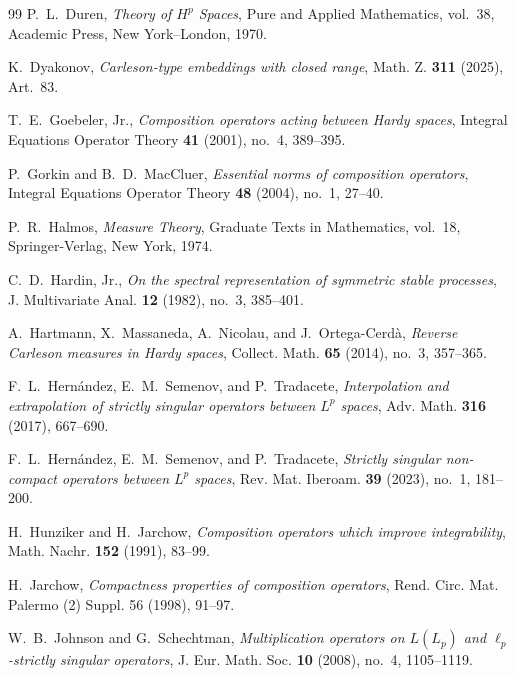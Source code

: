 \documentclass[11pt, reqno]{amsart}
\theoremstyle{definition}
\theoremstyle{remark}
\begin{document}
\begin{thebibliography}{99}
P.~L.~Duren,
\textit{Theory of \(H^p\) Spaces},
Pure and Applied Mathematics, vol.~38,
Academic Press, New York--London, 1970.

K.~Dyakonov,
\textit{Carleson-type embeddings with closed range},
Math. Z. \textbf{311} (2025), Art.~83.

T.~E.~Goebeler, Jr.,
\textit{Composition operators acting between Hardy spaces},
Integral Equations Operator Theory \textbf{41} (2001),
no.~4, 389--395.

P.~Gorkin and B.~D.~MacCluer,
\textit{Essential norms of composition operators},
Integral Equations Operator Theory \textbf{48} (2004),
no.~1, 27--40.

P.~R.~Halmos,
\textit{Measure Theory},
Graduate Texts in Mathematics, vol.~18,
Springer-Verlag, New York, 1974.

C.~D.~Hardin, Jr.,
\textit{On the spectral representation of symmetric stable processes},
J. Multivariate Anal. \textbf{12} (1982), no.~3, 385--401.

A.~Hartmann, X.~Massaneda, A.~Nicolau, and J.~Ortega-Cerd\`a,
\textit{Reverse Carleson measures in Hardy spaces},
Collect. Math. \textbf{65} (2014), no.~3, 357--365.

F.~L.~Hern\'andez, E.~M.~Semenov, and P.~Tradacete,
\textit{Interpolation and extrapolation of strictly singular operators
between \(L^p\) spaces},
Adv. Math. \textbf{316} (2017), 667--690.

F.~L.~Hern\'andez, E.~M.~Semenov, and P.~Tradacete,
\textit{Strictly singular non-compact operators between \(L^p\) spaces},
Rev. Mat. Iberoam. \textbf{39} (2023), no.~1, 181--200.

H.~Hunziker and H.~Jarchow,
\textit{Composition operators which improve integrability},
Math. Nachr. \textbf{152} (1991), 83--99.

H.~Jarchow,
\textit{Compactness properties of composition operators},
Rend. Circ. Mat. Palermo (2) Suppl. 56 (1998), 91--97.

W.~B.~Johnson and G.~Schechtman,
\textit{Multiplication operators on \(L(L_p)\) and
\(\ell_p\)-strictly singular operators},
J. Eur. Math. Soc. \textbf{10} (2008), no.~4, 1105--1119.


\end{thebibliography}
\end{document}
